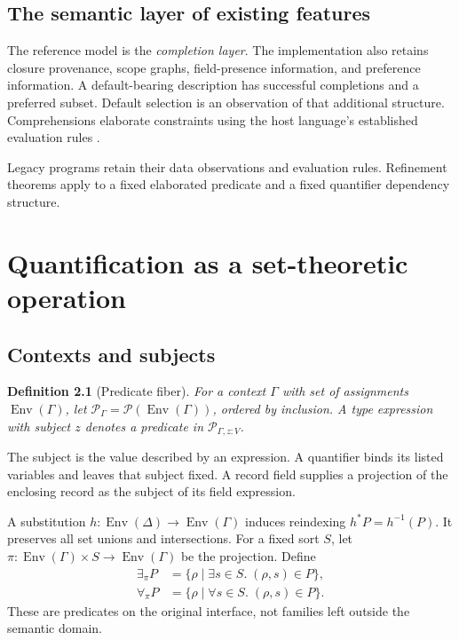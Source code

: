 \documentclass[11pt,a4paper,oneside]{report}
\newcommand{\Pow}{\mathcal P}
\newcommand{\Env}{\operatorname{Env}}
\newtheorem{definition}{Definition}[chapter]
\theoremstyle{remark}
\begin{document}
\section{The semantic layer of existing features}
The reference model is the \emph{completion layer}. The implementation also
retains closure provenance, scope graphs, field-presence information, and
preference information. A default-bearing description has successful
completions and a preferred subset. Default selection is an observation of that
additional structure. Comprehensions elaborate constraints using the host
language's established evaluation rules \cite{cuedefaults}.

Legacy programs retain their data observations and evaluation rules.
Refinement theorems apply to a fixed elaborated predicate and a fixed quantifier
dependency structure.

\chapter{Quantification as a set-theoretic operation}
\label{ch:quantifiers}
\section{Contexts and subjects}
\begin{definition}[Predicate fiber]
For a context $\Gamma$ with set of assignments $\Env(\Gamma)$, let
$\mathcal P_\Gamma=\Pow(\Env(\Gamma))$, ordered by inclusion. A type expression
with subject $z$ denotes a predicate in $\mathcal P_{\Gamma,z:V}$.
\end{definition}
The subject is the value described by an expression. A quantifier binds its
listed variables and leaves that subject fixed. A record field supplies a
projection of the enclosing record as the subject of its field expression.

A substitution $h:\Env(\Delta)\to\Env(\Gamma)$ induces reindexing
$h^*P=h^{-1}(P)$. It preserves all set unions and intersections.
For a fixed sort $S$, let
$\pi:\Env(\Gamma)\times S\to\Env(\Gamma)$ be the projection.
Define
\begin{align}
 \exists_\pi P
 &=\{\rho\mid\exists s\in S.\;(\rho,s)\in P\},\label{eq:exists}\\
 \forall_\pi P
 &=\{\rho\mid\forall s\in S.\;(\rho,s)\in P\}.\label{eq:forall}
\end{align}
These are predicates on the original interface, not families left outside the
semantic domain.
\end{document}
